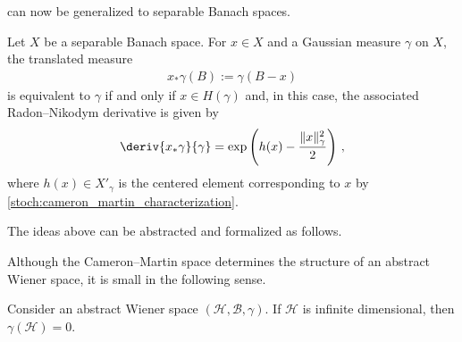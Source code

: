      can now be generalized to separable Banach spaces.
    \begin{theorem}
        Let $X$ be a separable Banach space. For $x\in X$ and a Gaussian measure $\gamma$ on $X$, the translated measure
        \begin{gather}
            x_*\gamma(B) := \gamma(B-x)
        \end{gather}
        is equivalent to $\gamma$ if and only if $x\in H(\gamma)$ and, in this case, the associated Radon--Nikodym derivative is given by
        \begin{gather}
            \deriv{x_*\gamma}{\gamma} = \exp\left(h(x) - \frac{\|x\|_\gamma^2}{2}\right)\,,
        \end{gather}
        where $h(x)\in X'_\gamma$ is the centered element corresponding to $x$ by \cref{stoch:cameron_martin_characterization}.
    \end{theorem}

    The ideas above can be abstracted and formalized as follows.

    Although the Cameron--Martin space determines the structure of an abstract Wiener space, it is small in the following sense.
    \begin{property}
        Consider an abstract Wiener space $(\mathcal{H},\mathcal{B},\gamma)$. If $\mathcal{H}$ is infinite dimensional, then $\gamma(\mathcal{H})=0$.
    \end{property}

